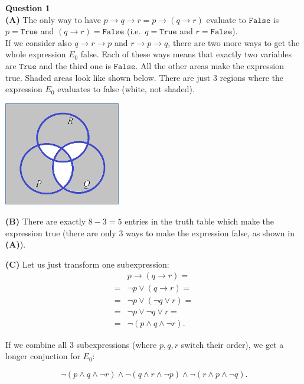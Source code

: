 \documentclass[jou]{apa6}
\begin{document}
\vspace{6pt}
{\bf Question 1}\\
{\bf (A)} The only way to have $p \rightarrow q \rightarrow r = p \rightarrow (q \rightarrow r)$ evaluate to 
$\mathtt{False}$ is $p = \mathtt{True}$ and $(q \rightarrow r) = \mathtt{False}$ (i.e.\ 
$q = \mathtt{True}$ and $r = \mathtt{False}$).\\
If we consider also $q \rightarrow r \rightarrow p$ and $r \rightarrow p \rightarrow q$, there are two 
more ways to get the whole expression $E_0$ false. Each of these ways means that exactly two variables
are $\mathtt{True}$ and the third one is $\mathtt{False}$. 
All the other areas make the expression true. Shaded areas look like shown below. There are just $3$ 
regions where the expression $E_0$ evaluates to false (white, not shaded). 
\begin{center}
\includegraphics[width=2in]{midterm/circles-shaded2.png}
\end{center}

{\bf (B)} There are exactly $8-3 = 5$ entries in the truth table which make the expression true
(there are only $3$ ways to make the expression false, as shown in {\bf (A)}). 

{\bf (C)} Let us just transform one subexpression: 
\begin{align}
 & p \rightarrow (q \rightarrow r) = \nonumber \\
= & \neg p \vee (q \rightarrow r) = \nonumber \\
= & \neg p \vee (\neg q \vee r) = \nonumber \\
= & \neg p \vee \neg q \vee r  = \nonumber \\
= & \neg (p \wedge q \wedge \neg r). \nonumber
\end{align}

If we combine all $3$ subexpressions (where $p,q,r$ switch their order), we get 
a longer conjuction for $E_0$:

$$\neg (p \wedge q \wedge \neg r) \wedge \neg (q \wedge r \wedge \neg p) \wedge \neg (r \wedge p \wedge \neg q).$$
\end{document}
